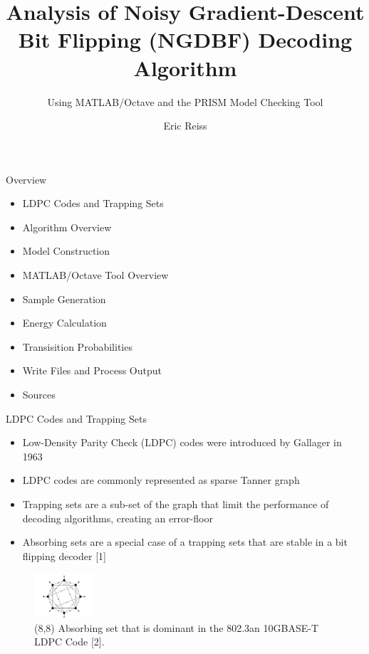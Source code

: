 \documentclass[10pt,ignorenonframetext,]{beamer}
\title{Analysis of Noisy Gradient-Descent Bit Flipping (NGDBF) Decoding
Algorithm}
\subtitle{Using MATLAB/Octave and the PRISM Model Checking Tool}
\author{Eric Reiss}
\date{}
\providecommand{\tightlist}{%
  \setlength{\itemsep}{0pt}\setlength{\parskip}{0pt}}
\begin{document}
\frame{\titlepage}

\begin{frame}{Overview}
\protect\hypertarget{overview}{}
\begin{itemize}[<+->]
\tightlist
\item
  LDPC Codes and Trapping Sets
\item
  Algorithm Overview
\item
  Model Construction
\item
  MATLAB/Octave Tool Overview
\item
  Sample Generation
\item
  Energy Calculation
\item
  Transisition Probabilities
\item
  Write Files and Process Output
\item
  Sources
\end{itemize}
\end{frame}

\begin{frame}{LDPC Codes and Trapping Sets}
\protect\hypertarget{ldpc-codes-and-trapping-sets}{}
\begin{itemize}[<+->]
\tightlist
\item
  Low-Density Parity Check (LDPC) codes were introduced by Gallager in
  1963
\item
  LDPC codes are commonly represented as sparse Tanner graph
\item
  Trapping sets are a sub-set of the graph that limit the performance of
  decoding algorithms, creating an error-floor
\item
  Absorbing sets are a special case of a trapping sets that are stable
  in a bit flipping decoder {[}1{]}
\end{itemize}

\begin{figure}
\centering
\includegraphics[width=0.2\textwidth,height=\textheight]{figures/8_8_absorbing.png}
\caption{(8,8) Absorbing set that is dominant in the 802.3an 10GBASE-T
LDPC Code {[}2{]}.}
\end{figure}
\end{frame}
\end{document}
